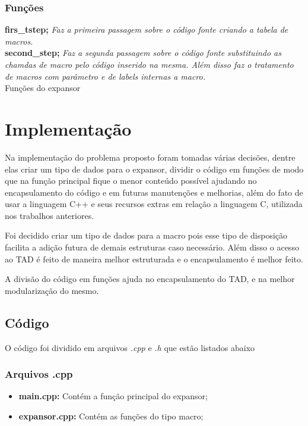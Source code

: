 \documentclass[12pt]{article}
\begin{document}
\subsubsection{Funções}
\begin{algorithm}[h!]
\begin{footnotesize}
   \textbf{firs\_tstep;} \textit{Faz a primeira passagem sobre o código fonte
   criando a tabela de macros.} \\
   \textbf{second\_step;} \textit{Faz a segunda passagem sobre o código fonte
   substituindo as chamdas de macro pelo código inserido na mesma. Além disso
   faz o tratamento de macros com parâmetro e de labels internas a macro.} \\
\caption{Funções do expansor}
\end{footnotesize}
\end{algorithm}


\section{Implementação}
\label{implementacao}
Na implementação do problema proposto foram tomadas várias decisões, dentre
elas criar um tipo de dados para o expansor, dividir o código em funções
de modo que na função principal fique o menor conteúdo possível ajudando no
encapsulamento do código e em futuras manutenções e melhorias, além do fato de
usar a linguagem C++ e seus recursos extras em relação a linguagem C, utilizada
nos trabalhos anteriores.

Foi decidido criar um tipo de dados para a macro pois esse tipo de
disposição facilita a adição futura de demais estruturas caso necessário.
Além disso o acesso ao TAD é feito de maneira melhor estruturada e o
encapsulamento é melhor feito.

A divisão do código em funções ajuda no encapsulamento do TAD, e na melhor
modularização do mesmo.

\subsection{Código}
O código foi dividido em arquivos \textit{.cpp} e \textit{.h} que estão listados
abaixo

\subsubsection{Arquivos .cpp}
\begin{itemize}
\item \textbf{main.cpp:} Contém a função principal do expansor;
\item \textbf{expansor.cpp:} Contém as funções do tipo macro;
\end{itemize}
\end{document}
